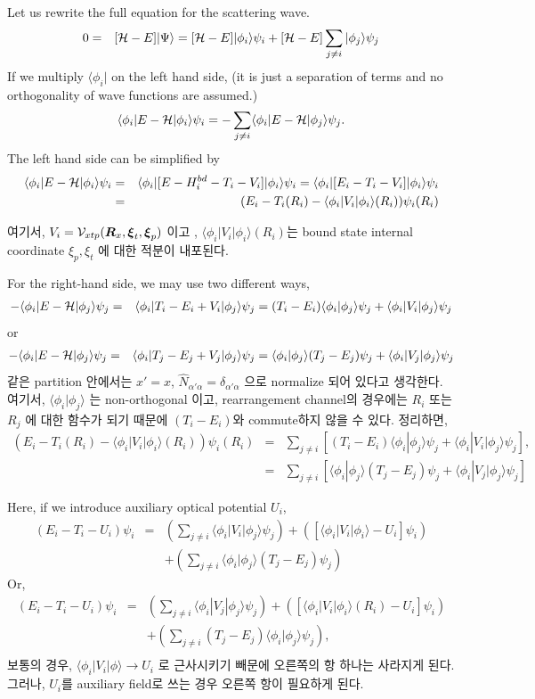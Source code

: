 \documentclass[11pt]{book}
\def\bm{\boldsymbol}
\def\la{\langle}
\def\ra{\rangle}
\newcommand{\bea}{\begin{eqnarray}}
\newcommand{\eea}{\end{eqnarray}}
\newcommand{\no}{\nonumber \\}
\begin{document}
Let us rewrite the full equation for the scattering wave. 
\bea 
0&=&[{\cal H}-E]|\Psi\ra 
  =[{\cal H}-E]|\phi_i\ra \psi_i +
    [{\cal H}-E]\sum_{j\neq i}|\phi_j\ra \psi_j
\eea 
If we multiply $\la \phi_i|$ on the left hand side, (it is just a separation of terms
and no orthogonality of wave functions are assumed.)
\bea 
\la \phi_i|E-{\cal H}|\phi_i\ra \psi_i
= -\sum_{j\neq i}\la \phi_i|E-{\cal H}|\phi_j\ra \psi_j.
\eea 
The left hand side can be simplified by
\bea 
\la \phi_i|E-{\cal H}|\phi_i\ra \psi_i
&=&\la \phi_i|[E-H_i^{bd}-T_i-V_i]|\phi_i\ra \psi_i
=\la \phi_i|[E_i-T_i-V_i]|\phi_i\ra \psi_i \no 
&=&(E_i-T_i(R_i)-\la\phi_i|V_i|\phi_i\ra(R_i))\psi_i(R_i)
\eea 

여기서, $V_i={\cal V}_{xtp}({\bm R}_x,{\bm \xi}_t,{\bm \xi}_p)$ 이고 ,
$\la\phi_i|V_i|\phi_i\ra(R_i)$는 bound state internal coordinate $\xi_p,\xi_t$
에 대한 적분이 내포된다. 

For the right-hand side, we may use two different ways,
\bea
-\la \phi_i|E-{\cal H}|\phi_j\ra \psi_j
&=& \la \phi_i|T_i-E_i+V_i|\phi_j\ra \psi_j 
   = (T_i-E_i) \la \phi_i|\phi_j\ra\psi_j
     +\la \phi_i|V_i|\phi_j\ra \psi_j  
\eea 
or 
\bea 
-\la \phi_i|E-{\cal H}|\phi_j\ra \psi_j
&=& \la \phi_i|T_j-E_j+V_j|\phi_j\ra \psi_j 
   =  \la \phi_i|\phi_j\ra (T_j-E_j)\psi_j
     +\la \phi_i|V_j|\phi_j\ra \psi_j  
\eea 
같은 partition 안에서는 $x'=x$,
$\hat{N}_{\alpha'\alpha}=\delta_{\alpha'\alpha}$ 으로 normalize 되어 있다고 생각한다.
여기서, $\la \phi_i|\phi_j\ra$ 는 non-orthogonal 이고, rearrangement channel의 경우에는
$R_i$ 또는 $R_j$ 에 대한 함수가 되기 때문에 $(T_i-E_i)$와 commute하지 않을 수 있다. 
정리하면,
\bea 
(E_i-T_i(R_i)-\la\phi_i|V_i|\phi_i\ra(R_i))\psi_i(R_i)
&=&\sum_{j\neq i}\left[ (T_i-E_i) \la \phi_i|\phi_j\ra\psi_j
     +\la \phi_i|V_i|\phi_j\ra \psi_j \right] ,\no 
&=&\sum_{j\neq i} \left[ \la \phi_i|\phi_j\ra (T_j-E_j)\psi_j
     +\la \phi_i|V_j|\phi_j\ra \psi_j\right]       
\eea 

Here, if we introduce auxiliary optical potential $U_i$,
\bea 
(E_i-T_i-U_i)\psi_i
&=& \left( \sum_{j\neq i} \la \phi_i|V_i|\phi_j\ra \psi_j \right)
   +\left( [\la\phi_i|V_i|\phi_i\ra-U_i]\psi_i \right) \no & &
   +\left( \sum_{j\neq i} \la \phi_i|\phi_j\ra (T_j-E_j)\psi_j \right)
\eea 
Or,
\bea     
(E_i-T_i-U_i)\psi_i
&=& \left( \sum_{j\neq i} \la \phi_i|V_j|\phi_j\ra \psi_j \right)
   +\left( [\la\phi_i|V_i|\phi_i\ra(R_i)-U_i]\psi_i \right) 
   \no & & 
   +\left( \sum_{j\neq i}  (T_j-E_j)\la \phi_i|\phi_j\ra \psi_j \right) ,\no   
\eea 
보통의 경우, $\la \phi_i|V_i|\phi\ra\to U_i$ 로 근사시키기 빼문에 오른쪽의 항 하나는 사라지게 된다.
그러나, $U_i$를 auxiliary field로 쓰는 경우 오른쪽 항이 필요하게 된다. 
\end{document}
